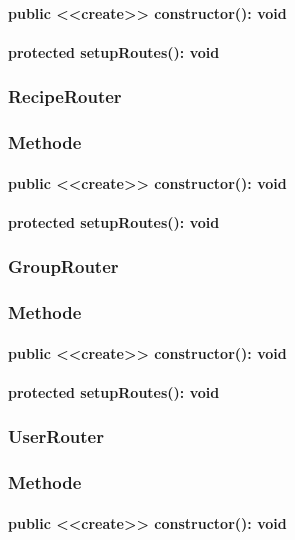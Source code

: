 \documentclass[parskip=full]{scrartcl}
\begin{document}
\paragraph{public <<create>> constructor(): void}
\paragraph{protected setupRoutes(): void}

\subsubsection{RecipeRouter}
\subsubsection*{Methode}
\paragraph{public <<create>> constructor(): void}
\paragraph{protected setupRoutes(): void}

\subsubsection{GroupRouter}
\subsubsection*{Methode}
\paragraph{public <<create>> constructor(): void}
\paragraph{protected setupRoutes(): void}

\subsubsection{UserRouter}
\subsubsection*{Methode}
\paragraph{public <<create>> constructor(): void}
\end{document}
